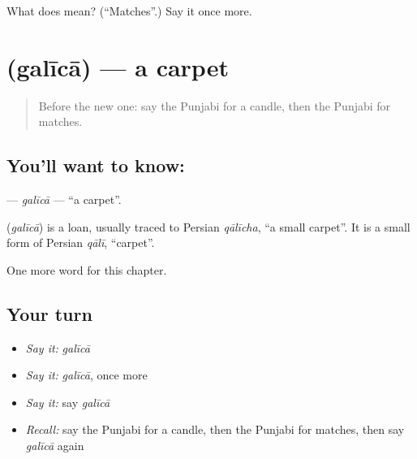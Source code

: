 \begin{tcolorbox}[breakable,colback=teal!4,colframe=teal!35!black,title={Before you move on}]
What does  mean? (\textquotedblleft{}Matches\textquotedblright{}.) Say it once more.
\end{tcolorbox}
\section[\texorpdfstring{\pa{ਗਲੀਚਾ} (galīcā)}{ਗਲੀਚਾ (galīcā)}]{ (galīcā) — a carpet}

\label{lesson:PA-C118-galica}



\begin{quote}
Before the new one: say the Punjabi for a candle, then the Punjabi for matches.
\end{quote}

\subsection*{You'll want to know: }
\textbf{} — \emph{galīcā} — \textquotedblleft{}a carpet\textquotedblright{}.

\begin{cousinweb}
\textbf{} (\emph{galīcā}) is a loan, usually traced to Persian \emph{qālīcha}, \textquotedblleft{}a small carpet\textquotedblright{}. It is a small form of Persian \emph{qālī}, \textquotedblleft{}carpet\textquotedblright{}.
\end{cousinweb}

\begin{grammarlens}[title={What you've built}]
One more word for this chapter.
\end{grammarlens}

\subsection*{Your turn}
\begin{itemize}
\raggedright
  \item \emph{Say it:} \emph{galīcā}
  \item \emph{Say it:} \emph{galīcā}, once more
  \item \emph{Say it:} say \emph{galīcā}
  \item \emph{Recall:} say the Punjabi for a candle, then the Punjabi for matches, then say \emph{galīcā} again
\end{itemize}

